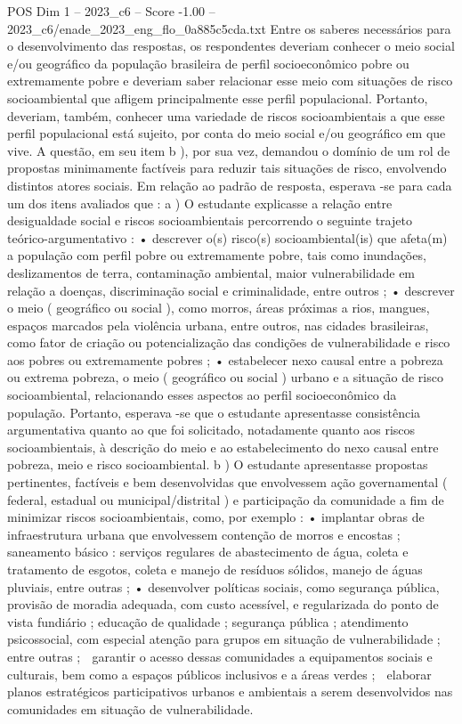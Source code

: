 \begin{textsample}{POS Dim 1 – 2023\_c6 – Score -1.00 – 2023\_c6/enade\_2023\_eng\_flo\_0a885c5cda.txt}
Entre os saberes necessários para o desenvolvimento das respostas, os respondentes deveriam conhecer o meio social e/ou geográfico da população brasileira de perfil socioeconômico pobre ou extremamente pobre e deveriam saber relacionar esse meio com situações de risco socioambiental que afligem principalmente esse perfil populacional.
Portanto, deveriam, também, conhecer uma variedade de riscos socioambientais a que esse perfil populacional está sujeito, por conta do meio social e/ou geográfico em que vive.
A questão, em seu item b ), por sua vez, demandou o domínio de um rol de propostas minimamente factíveis para reduzir tais situações de risco, envolvendo distintos atores sociais.
Em relação ao padrão de resposta, esperava -se para cada um dos itens avaliados que : a ) O estudante explicasse a relação entre desigualdade social e riscos socioambientais percorrendo o seguinte trajeto teórico-argumentativo : • descrever o(s) risco(s) socioambiental(is) que afeta(m) a população com perfil pobre ou extremamente pobre, tais como inundações, deslizamentos de terra, contaminação ambiental, maior vulnerabilidade em relação a doenças, discriminação social e criminalidade, entre outros ; • descrever o meio ( geográfico ou social ), como morros, áreas próximas a rios, mangues, espaços marcados pela violência urbana, entre outros, nas cidades brasileiras, como fator de criação ou potencialização das condições de vulnerabilidade e risco aos pobres ou extremamente pobres ; • estabelecer nexo causal entre a pobreza ou extrema pobreza, o meio ( geográfico ou social ) urbano e a situação de risco socioambiental, relacionando esses aspectos ao perfil socioeconômico da população.
Portanto, esperava -se que o estudante apresentasse consistência argumentativa quanto ao que foi solicitado, notadamente quanto aos riscos socioambientais, à descrição do meio e ao estabelecimento do nexo causal entre pobreza, meio e risco socioambiental. b ) O estudante apresentasse propostas pertinentes, factíveis e bem desenvolvidas que envolvessem ação governamental ( federal, estadual ou municipal/distrital ) e participação da comunidade a fim de minimizar riscos socioambientais, como, por exemplo : • implantar obras de infraestrutura urbana que envolvessem contenção de morros e encostas ; saneamento básico : serviços regulares de abastecimento de água, coleta e tratamento de esgotos, coleta e manejo de resíduos sólidos, manejo de águas pluviais, entre outras ; • desenvolver políticas sociais, como segurança pública, provisão de moradia adequada, com custo acessível, e regularizada do ponto de vista fundiário ; educação de qualidade ; segurança pública ; atendimento psicossocial, com especial atenção para grupos em situação de vulnerabilidade ; entre outras ;  garantir o acesso dessas comunidades a equipamentos sociais e culturais, bem como a espaços públicos inclusivos e a áreas verdes ;  elaborar planos estratégicos participativos urbanos e ambientais a serem desenvolvidos nas comunidades em situação de vulnerabilidade.

\end{textsample}
